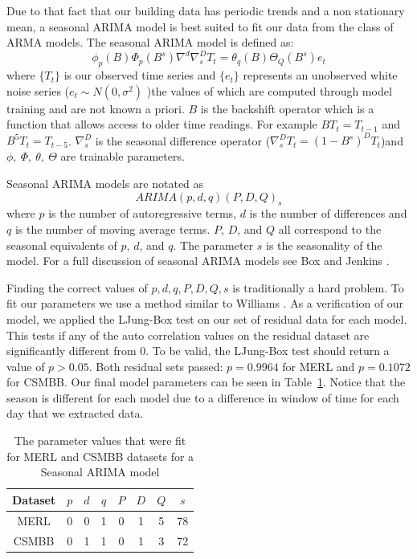 \documentclass{acm_proc_article-sp}
\begin{document}
Due to that fact that our building data has periodic trends and a non stationary mean, a seasonal ARIMA model is best suited to fit our data from the class of ARMA models.  The seasonal ARIMA model is defined as:
\begin{equation}
\label{eq:sarima}
\phi_{p}(B)\Phi_{p}(B^{s})\nabla^{d}\nabla^{D}_{s}T_{t} = \theta_{q}(B)\Theta_{Q}(B^{s})e_{t}
\end{equation}
\noindent
where $\{T_{t}\}$ is our observed time series and $\{e_t\}$ represents an unobserved white noise series ($e_{t} \sim N(0, \sigma^{2})$ )the values of which are computed through model training and are not known a priori.  $B$ is the backshift operator which is a function that allows access to older time readings.  For example $BT_{t} = T_{t-1}$ and $B^{5}T_{t} = T_{t-5}$.  $\nabla^{D}_{s}$ is the seasonal difference operator ($\nabla^{D}_{s}T_{t} = (1 - B^{s})^{D}T_{t}$)and $\phi,\  \Phi,\  \theta,\ \Theta$ are trainable parameters.  

Seasonal ARIMA models are notated as
\begin{equation}
ARIMA(p,d,q)(P,D,Q)_{s}
\end{equation}
where $p$ is the number of autoregressive terms, $d$ is the number of differences and $q$ is the number of moving average terms.  $P$, $D$, and $Q$ all correspond to the seasonal equivalents of $p$, $d$, and $q$.  The parameter $s$ is the seasonality of the model.  For a full discussion of seasonal ARIMA models see Box and Jenkins \cite{Box2008}.

Finding the correct values of $p, d, q, P, D, Q, s$ is traditionally a hard problem.  To fit our parameters we use a method similar to Williams \cite{Williams2003}.  As a verification of our model, we applied the LJung-Box test \cite{Ljung1978} on our set of residual data for each model.  This tests if any of the auto correlation values on the residual dataset are significantly different from 0.  To be valid, the LJung-Box test should return a value of $p > 0.05$.  Both residual sets passed: $p = 0.9964$ for MERL and $p = 0.1072$ for CSMBB.  Our final model parameters can be seen in Table~\ref{fig:sarimatab}.  Notice that the season is different for each model due to a difference in window of time for each day that we extracted data.

\begin{table}[t]
\centering
\caption{The parameter values that were fit for MERL and CSMBB datasets for a Seasonal ARIMA model}
\begin{tabular}{|c|c|c|c|c|c|c|c|} \hline
Dataset & $p$ & $d$ & $q$ & $P$ & $D$ & $Q$ & $s$\\ \hline
MERL & 0 & 0 & 1 & 0 & 1 & 5 & 78\\ \hline
CSMBB & 0 & 1 & 1 & 0 & 1 & 3 & 72\\ \hline
\end{tabular}
\label{fig:sarimatab}
\end{table}
\end{document}
